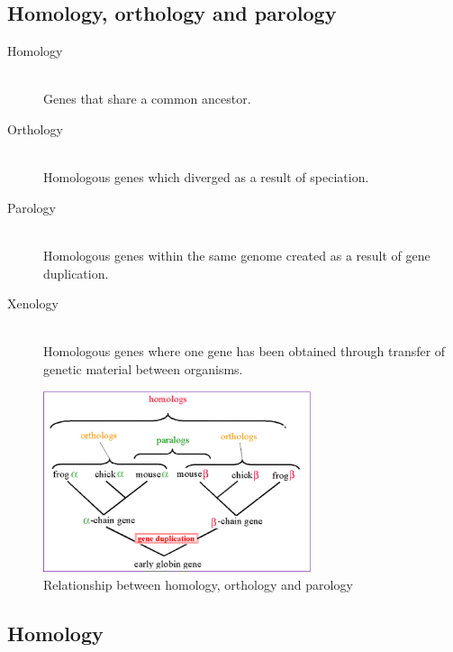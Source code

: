 \documentclass[a4paper]{article}
\begin{document}
\subsection{Homology, orthology and parology}

\begin{description}
  \item[Homology] \hfill \\
    Genes that share a common ancestor.

  \item[Orthology] \hfill \\
    Homologous genes which diverged as a result of speciation.

  \item[Parology] \hfill \\
    Homologous genes within the same genome created as a result of gene
    duplication.

  \item[Xenology] \hfill \\
    Homologous genes where one gene has been obtained through transfer of
    genetic material between organisms.

\end{description}

\begin{figure}[h!]
  \centering
  \includegraphics[width=0.7\textwidth]{graphics/homology_orthology_parology.eps}
  \caption{Relationship between homology, orthology and parology}
  \label{fig:homology_orthology_parology}
\end{figure}
\FloatBarrier

\subsection{Homology}
\end{document}
